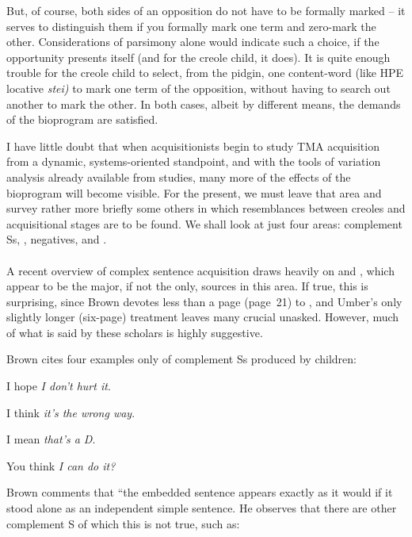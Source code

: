 But, of course, both sides of an opposition do not have to be formally marked -- it serves to distinguish them if you formally mark one term and zero-mark the other. Considerations of parsimony alone would indicate such a choice, if the opportunity presents itself (and for the creole child, it does). It is quite enough trouble for the creole child to select, from the pidgin, one content-word (like HPE locative \textit{stei)} to mark one term of the opposition, without having to search out another to mark the other. In both cases, albeit by different means, the demands of the bioprogram are satisfied.

I have little doubt that when acquisitionists begin to study TMA acquisition from a dynamic, systems-oriented standpoint, and with the tools of variation analysis already available from  studies, many more of the effects of the bioprogram will become visible. For the present, we must leave that area and survey rather more briefly some others in which resemblances between creoles and acquisitional stages are to be found. We shall look at just four areas: complement Ss, , negatives, and .\\\\

A recent overview of complex sentence acquisition \citep{Bowerman1979} draws heavily on \citet{Brown1973} and \citet{Limber1973}, which appear to be the major, if not the only, sources in this area. If true, this is surprising, since Brown devotes less than a page (page~21) to  , and Umber's only slightly longer (six-page) treatment leaves many crucial  unasked. However, much of what is said by these scholars is highly suggestive.

Brown cites four examples only of complement Ss produced by children:

\ea\label{ex:3:24}
 I hope \textit{I don't hurt it}.
\z

\ea\label{ex:3:25}
 I think \textit{it's the wrong way}.
\z

\ea\label{ex:3:26}
 I mean \textit{that's a D}.
\z

\ea\label{ex:3:27}
 You think \textit{I can do it?}
\z

\noindent Brown comments that ``the embedded sentence appears exactly as it would if it stood alone as an independent simple sentence. He observes that there are other  complement S of which this is not true, such as:

